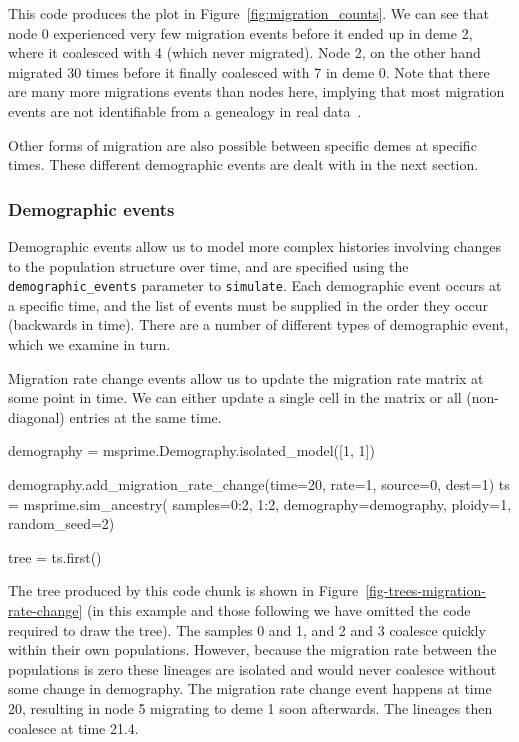 \documentclass[graybox]{svmult}
\begin{document}
This code produces the plot in Figure~\ref{fig:migration_counts}.
We can see that node 0 experienced very few migration events before it
ended up in deme 2, where it coalesced with 4 (which never migrated).
Node 2, on the other hand migrated 30 times before it finally coalesced
with 7 in deme 0. Note that there are many more migrations events than
nodes here, implying that most migration events are not identifiable
from a genealogy in real data~\citep{sousa2011nonidentifiability}.

Other forms of migration are also possible between specific demes at
specific times. These different demographic events are dealt with in the next section.

\subsubsection{Demographic events}\label{demographic-events}

Demographic events allow us to model more complex histories involving
changes to the population structure over time, and are specified using
the \texttt{demographic\_events} parameter to \texttt{simulate}. Each
demographic event occurs at a specific time, and the list of events must
be supplied in the order they occur (backwards in time). There are a
number of different types of demographic event, which we examine in
turn.

\label{migration-rate-change}

Migration rate change events allow us to update the migration rate
matrix at some point in time. We can either update a single cell in the
matrix or all (non-diagonal) entries at the same time.
\begin{pythoncode}
demography = msprime.Demography.isolated_model([1, 1])

demography.add_migration_rate_change(time=20, rate=1, source=0, dest=1)
ts  = msprime.sim_ancestry(
    samples={0:2, 1:2},
    demography=demography,
    ploidy=1,
    random_seed=2)

tree = ts.first()

\end{pythoncode}

The tree produced by this code chunk is shown in
Figure~\ref{fig-trees-migration-rate-change} (in this example and those
following we have omitted the code required to draw the tree).
The samples 0 and 1, and 2 and 3 coalesce quickly within their
own populations. However, because the migration rate between the
populations is zero these lineages are isolated and would never coalesce
without some change in demography. The migration rate change event
happens at time 20, resulting in node 5 migrating to deme 1 soon
afterwards. The lineages then coalesce at time 21.4.
\end{document}
